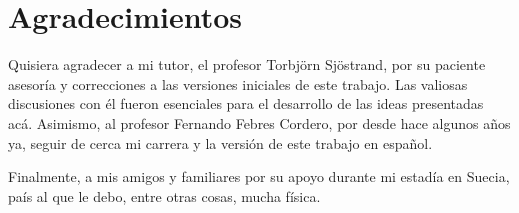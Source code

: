 \documentclass[a4paper,12pt]{article}
\begin{document}
\newpage

\tableofcontents

\newpage












\section*{Agradecimientos}

Quisiera agradecer a mi tutor, el profesor Torbjörn Sjöstrand, por su paciente asesoría y correcciones a las versiones iniciales de este trabajo. Las valiosas discusiones con él fueron esenciales para el desarrollo de las ideas presentadas acá. Asimismo, al profesor Fernando Febres Cordero, por desde hace algunos años ya, seguir de cerca mi carrera y la versión de este trabajo en español.

Finalmente, a mis amigos y familiares por su apoyo durante mi estadía en Suecia, país al que le debo, entre otras cosas, mucha física.
\end{document}
